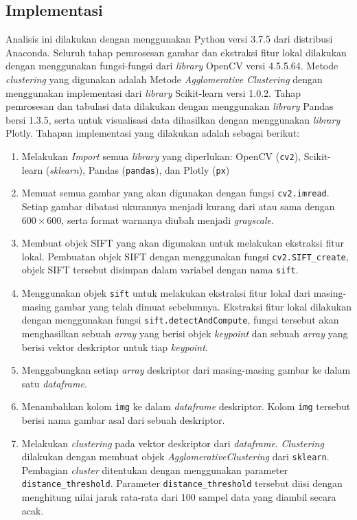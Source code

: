 \subsection{Implementasi}
Analisis ini dilakukan dengan menggunakan Python versi 3.7.5 dari distribusi Anaconda. Seluruh tahap pemrosesan gambar dan ekstraksi fitur lokal dilakukan dengan menggunakan fungsi-fungsi dari \textit{library} OpenCV versi 4.5.5.64. Metode \textit{clustering} yang digunakan adalah Metode \textit{Agglomerative Clustering} dengan menggunakan implementasi dari \textit{library} Scikit-learn versi 1.0.2. Tahap pemrosesan dan tabulasi data dilakukan dengan menggunakan \textit{library} Pandas bersi 1.3.5, serta untuk visualisasi data dihasilkan dengan menggunakan \textit{library} Plotly. Tahapan implementasi yang dilakukan adalah sebagai berikut:
\begin{enumerate}
	\item Melakukan \textit{Import} semua \textit{library} yang diperlukan: OpenCV (\texttt{cv2}), Scikit-learn (\textit{sklearn}), Pandas (\texttt{pandas}), dan Plotly (\texttt{px})
	\item Memuat semua gambar yang akan digunakan dengan fungsi \texttt{cv2.imread}. Setiap gambar dibatasi ukurannya menjadi kurang dari atau sama dengan $600\times600$, serta format warnanya diubah menjadi \textit{grayscale}.
	\item Membuat objek SIFT yang akan digunakan untuk melakukan ekstraksi fitur lokal. Pembuatan objek SIFT dengan menggunakan fungsi \texttt{cv2.SIFT\_create}, objek SIFT tersebut disimpan dalam variabel dengan nama \texttt{sift}.
	\item Menggunakan objek \texttt{sift} untuk melakukan ekstraksi fitur lokal dari masing-masing gambar yang telah dimuat sebelumnya. Ekstraksi fitur lokal dilakukan dengan menggunakan fungsi \texttt{sift.detectAndCompute}, fungsi tersebut akan menghasilkan sebuah \textit{array} yang berisi objek \textit{keypoint} dan sebuah \textit{array} yang berisi vektor deskriptor untuk tiap \textit{keypoint}. 
	\item Menggabungkan setiap \textit{array} deskriptor dari masing-masing gambar ke dalam satu \textit{dataframe}.
	\item Menambahkan kolom \texttt{img} ke dalam \textit{dataframe} deskriptor. Kolom \texttt{img} tersebut berisi nama gambar asal dari sebuah deskriptor.
	\item Melakukan \textit{clustering} pada vektor deskriptor dari \textit{dataframe}. \textit{Clustering} dilakukan dengan membuat objek \textit{AgglomerativeClustering} dari \texttt{sklearn}. Pembagian \textit{cluster} ditentukan dengan menggunakan parameter \texttt{distance\_threshold}. Parameter \texttt{distance\_threshold} tersebut diisi dengan menghitung nilai jarak rata-rata dari 100 sampel data yang diambil secara acak.

\end{enumerate}
